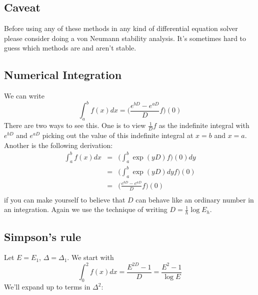 \documentclass[a4paper]{article}
\theoremstyle{definition}
\begin{document}
\subsection{Caveat}
Before using any of these methods in any kind of differential equation solver please consider doing a von Neumann stability analysis.
It's sometimes hard to guess which methods are and aren't stable.

\subsection{Numerical Integration}
We can write
\[
\int_a^b f(x)dx = \Big(\frac{e^{bD}-e^{aD}}{D}f\Big)(0)
\]
There are two ways to see this.
One is to view $\frac{1}{D}f$ as the indefinite integral with $e^{bD}$ and $e^{aD}$ picking out the value of this indefinite integral at $x=b$ and $x=a$.
Another is the following derivation:
\begin{eqnarray*}
\int_a^b f(x)dx & = & \Big(\int_a^b\exp(yD)f\Big)(0) dy \\
& = & \Big(\int_a^b\exp(yD)dy f\Big)(0) \\
& = & \Big(\frac{e^{bD}-e^{aD}}{D}f\Big)(0) \\
\end{eqnarray*}
if you can make yourself to believe that $D$ can behave like an ordinary number in an integration.
Again we use the technique of writing $D=\frac{1}{h}\log E_h$.

\subsection{Simpson's rule}
Let $E=E_1$, $\Delta=\Delta_1$.
We start with
\[
\int_0^2f(x)dx = \frac{E^{2D}-1}{D} = \frac{E^2-1}{\log E}
\]
We'll expand up to terms in $\Delta^2$:
\end{document}
